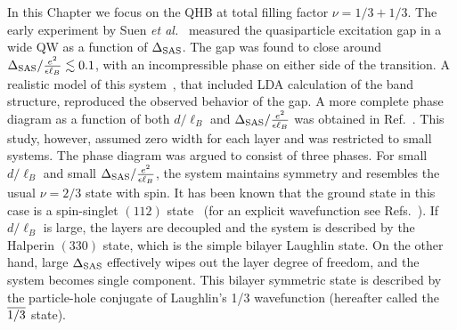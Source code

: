 In this Chapter we focus on the QHB at total filling factor $\nu=1/3+1/3$.
The early experiment by Suen \emph{et al.}~\cite{Suen94} measured the quasiparticle excitation gap in a wide QW as a function of $\Delta_\textrm{SAS}$.
The gap was found to close around $\Delta_\textrm{SAS}/\frac{e^2}{\epsilon\ell_B} \lesssim 0.1$, with an incompressible phase on either side of the transition.
A realistic model of this system~\cite{Lay97}, that included LDA calculation of the band structure, reproduced the observed behavior of the gap. 
A more complete phase diagram as a function of both $d/\ell_B$ and $\Delta_\textrm{SAS}/\frac{e^2}{\epsilon\ell_B}$ was obtained in Ref.~\cite{HaldaneDiagram}.
This study, however, assumed zero width for each layer and was restricted to small systems.
The phase diagram was argued to consist of three phases.
For small $d/\ell_B$ and small $\Delta_\textrm{SAS}/\frac{e^2}{\epsilon\ell_B}$, the system maintains  symmetry and resembles the usual $\nu=2/3$ state with spin.
It has been known that the ground state in this case is a spin-singlet $(112)$ state~\cite{Chakraborty84, Rezayi87, Maksym89, Wu93} (for an explicit wavefunction see Refs.~\cite{HaldaneDiagram,Moore97}). 
If $d/\ell_B$ is large, the layers are decoupled and the system is described by the Halperin $(330)$ state, which is the simple bilayer Laughlin state.
On the other hand, large $\Delta_\textrm{SAS}$ effectively wipes out the layer degree of freedom, and the system becomes single component.
This bilayer symmetric state is described by the particle-hole conjugate of Laughlin's 1/3 wavefunction (hereafter called the $\overline{1/3}$ state).         


